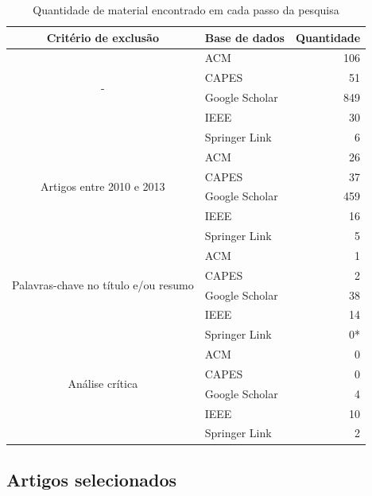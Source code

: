 \begin{table}[H]
	\centering
	\begin{tabular}{| c | l | r |} \hline \textbf{Critério de exclusão} & \textbf{Base de dados}  & \textbf{Quantidade} \\ \hline
		\multirow{4}{*}{-}
			& ACM & 106 \\ \cline{2-3}
			& CAPES & 51 \\ \cline{2-3}
			& Google Scholar & 849 \\ \cline{2-3}
			& IEEE & 30 \\ \cline{2-3}
			& Springer Link & 6 \\ \cline{2-3}
		\hline \hline
		\multirow{4}{*}{Artigos entre 2010 e 2013} 
			& ACM & 26 \\ \cline{2-3}
			& CAPES & 37 \\ \cline{2-3}
			& Google Scholar & 459 \\ \cline{2-3}
			& IEEE & 16 \\ \cline{2-3}
			& Springer Link & 5 \\ \cline{2-3}
		\hline \hline
		\multirow{4}{*}{Palavras-chave no título e/ou resumo} 
			& ACM & 1 \\ \cline{2-3}
			& CAPES & 2 \\ \cline{2-3}
			& Google Scholar & 38 \\ \cline{2-3}
			& IEEE & 14 \\ \cline{2-3}
			& Springer Link & 0* \\ \cline{2-3}
		\hline \hline
		\multirow{4}{*}{Análise crítica}
			& ACM & 0 \\ \cline{2-3}
			& CAPES & 0 \\ \cline{2-3}
			& Google Scholar & 4 \\ \cline{2-3}
			& IEEE & 10 \\ \cline{2-3}
			& Springer Link & 2 \\ \cline{2-3}
		\hline
	\end{tabular}
	\captionsetup{justification=centering}
	\caption{Quantidade de material encontrado em cada passo da pesquisa}
	\label{tab:quantidadeDeMateriais}
\end{table}

\subsection{Artigos selecionados}

